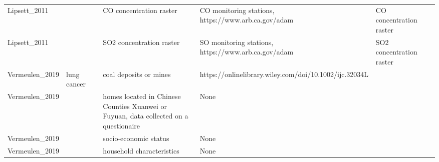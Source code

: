 \documentclass{article}
\begin{document}
\begin{table}
\begin{tabular}{lllllll}
Lipsett\_2011    &                                                                                                     &         & CO concentration raster                                                                       & CO monitoring stations, https://www.arb.ca.gov/adam                                                                                                                                              & CO concentration raster               &          \\
Lipsett\_2011    &                                                                                                     &         & SO2 concentration raster                                                                      & SO monitoring stations, https://www.arb.ca.gov/adam                                                                                                                                              & SO2 concentration raster              &          \\
Vermeulen\_2019  & lung cancer                                                                                         &         & coal deposits or mines                                                                        & https://onlinelibrary.wiley.com/doi/10.1002/ijc.32034L                                                                                                                                           &                                       &          \\
Vermeulen\_2019  &                                                                                                     &         & homes located in Chinese Counties Xuanwei or Fuyuan, data collected on a questionaire         & None                                                                                                                                                                                             &                                       &          \\
Vermeulen\_2019  &                                                                                                     &         & socio-economic status                                                                         & None                                                                                                                                                                                             &                                       &          \\
Vermeulen\_2019  &                                                                                                     &         & household characteristics                                                                     & None                                                                                                                                                                                             &                                       &          \\

\end{tabular}
\end{table}
\end{document}
